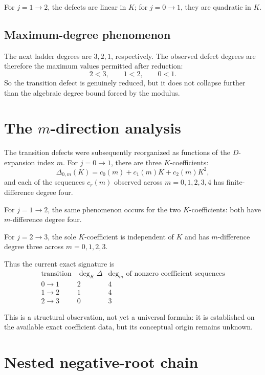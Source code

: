\documentclass[11pt,a4paper]{article}
\begin{document}
For $j=1\to2$, the defects are linear in $K$; for $j=0\to1$, they are quadratic in $K$.

\subsection{Maximum-degree phenomenon}

The next ladder degrees are $3,2,1$, respectively. The observed defect degrees are therefore the maximum values permitted after reduction:
\[
2<3,\qquad 1<2,\qquad 0<1.
\]
So the transition defect is genuinely reduced, but it does not collapse further than the algebraic degree bound forced by the modulus.

\section{The $m$-direction analysis}

The transition defects were subsequently reorganized as functions of the $D$-expansion index $m$.
For $j=0\to1$, there are three $K$-coefficients:
\[
\Delta_{0,m}(K)
=c_0(m)+c_1(m)K+c_2(m)K^2,
\]
and each of the sequences $c_r(m)$ observed across $m=0,1,2,3,4$ has finite-difference degree four.

For $j=1\to2$, the same phenomenon occurs for the two $K$-coefficients: both have $m$-difference degree four.

For $j=2\to3$, the sole $K$-coefficient is independent of $K$ and has $m$-difference degree three across $m=0,1,2,3$.

Thus the current exact signature is
\begin{equation}
\begin{array}{c|c|c}
\text{transition}&\deg_K\Delta&\deg_m\text{ of nonzero coefficient sequences}\\
\hline
0\to1&2&4\\
1\to2&1&4\\
2\to3&0&3
\end{array}
\label{eq:signature}
\end{equation}

This is a structural observation, not yet a universal formula: it is established on the available exact coefficient data, but its conceptual origin remains unknown.

\section{Nested negative-root chain}
\end{document}
